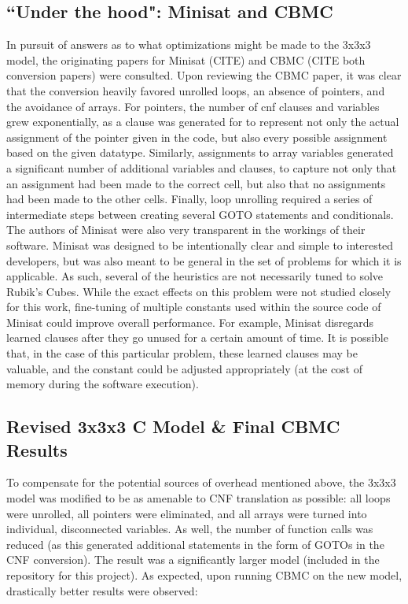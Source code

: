 \documentclass{article}
\begin{document}
\subsection {``Under the hood": Minisat and CBMC}

In pursuit of answers as to what optimizations might be made to the 3x3x3 model, the originating papers for Minisat (CITE) and CBMC (CITE both conversion papers) were consulted. Upon reviewing the CBMC paper, it was clear that the conversion heavily favored unrolled loops, an absence of pointers, and the avoidance of arrays. For pointers, the number of cnf clauses and variables grew exponentially, as a clause was generated for to represent not only the actual assignment of the pointer given in the code, but also every possible assignment based on the given datatype. Similarly, assignments to array variables generated a significant number of additional variables and clauses, to capture not only that an assignment had been made to the correct cell, but also that no assignments had been made to the other cells. Finally, loop unrolling required a series of intermediate steps between creating several GOTO statements and conditionals. \\

\noindent The authors of Minisat were also very transparent in the workings of their software. Minisat was designed to be intentionally clear and simple to interested developers, but was also meant to be general in the set of problems for which it is applicable. As such, several of the heuristics are not necessarily tuned to solve Rubik's Cubes. While the exact effects on this problem were not studied closely for this work, fine-tuning of multiple constants used within the source code of Minisat could improve overall performance. For example, Minisat disregards learned clauses after they go unused for a certain amount of time. It is possible that, in the case of this particular problem, these learned clauses may be valuable, and the constant could be adjusted appropriately (at the cost of memory during the software execution).

\subsection {Revised 3x3x3 C Model \& Final CBMC Results}

To compensate for the potential sources of overhead mentioned above, the 3x3x3 model was modified to be as amenable to CNF translation as possible: all loops were unrolled, all pointers were eliminated, and all arrays were turned into individual, disconnected variables. As well, the number of function calls was reduced (as this generated additional statements in the form of GOTOs in the CNF conversion). The result was a significantly larger model (included in the repository for this project). As expected, upon running CBMC on the new model, drastically better results were observed:\\
\end{document}
